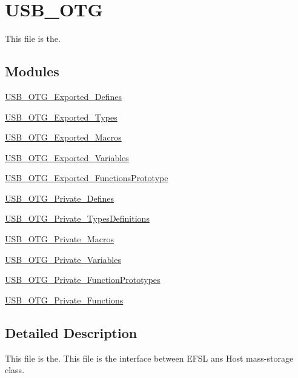 \hypertarget{group___u_s_b___o_t_g}{\section{U\-S\-B\-\_\-\-O\-T\-G}
\label{group___u_s_b___o_t_g}
}


This file is the.  


\subsection*{Modules}
\begin{DoxyCompactItemize}
\item 
\hyperlink{group___u_s_b___o_t_g___exported___defines}{U\-S\-B\-\_\-\-O\-T\-G\-\_\-\-Exported\-\_\-\-Defines}
\item 
\hyperlink{group___u_s_b___o_t_g___exported___types}{U\-S\-B\-\_\-\-O\-T\-G\-\_\-\-Exported\-\_\-\-Types}
\item 
\hyperlink{group___u_s_b___o_t_g___exported___macros}{U\-S\-B\-\_\-\-O\-T\-G\-\_\-\-Exported\-\_\-\-Macros}
\item 
\hyperlink{group___u_s_b___o_t_g___exported___variables}{U\-S\-B\-\_\-\-O\-T\-G\-\_\-\-Exported\-\_\-\-Variables}
\item 
\hyperlink{group___u_s_b___o_t_g___exported___functions_prototype}{U\-S\-B\-\_\-\-O\-T\-G\-\_\-\-Exported\-\_\-\-Functions\-Prototype}
\item 
\hyperlink{group___u_s_b___o_t_g___private___defines}{U\-S\-B\-\_\-\-O\-T\-G\-\_\-\-Private\-\_\-\-Defines}
\item 
\hyperlink{group___u_s_b___o_t_g___private___types_definitions}{U\-S\-B\-\_\-\-O\-T\-G\-\_\-\-Private\-\_\-\-Types\-Definitions}
\item 
\hyperlink{group___u_s_b___o_t_g___private___macros}{U\-S\-B\-\_\-\-O\-T\-G\-\_\-\-Private\-\_\-\-Macros}
\item 
\hyperlink{group___u_s_b___o_t_g___private___variables}{U\-S\-B\-\_\-\-O\-T\-G\-\_\-\-Private\-\_\-\-Variables}
\item 
\hyperlink{group___u_s_b___o_t_g___private___function_prototypes}{U\-S\-B\-\_\-\-O\-T\-G\-\_\-\-Private\-\_\-\-Function\-Prototypes}
\item 
\hyperlink{group___u_s_b___o_t_g___private___functions}{U\-S\-B\-\_\-\-O\-T\-G\-\_\-\-Private\-\_\-\-Functions}
\end{DoxyCompactItemize}


\subsection{Detailed Description}
This file is the. This file is the interface between E\-F\-S\-L ans Host mass-\/storage class.